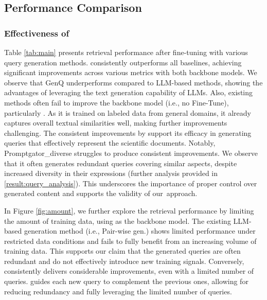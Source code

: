 


\subsection{Performance Comparison}
\label{sec:experimentresult}

\subsubsection{\textbf{Effectiveness of \proposed}}
\label{result:CCQGen}
Table \ref{tab:main} presents retrieval performance after fine-tuning with various query generation methods.
\proposed consistently outperforms all baselines, achieving significant improvements across various metrics with both backbone models.
We observe that GenQ underperforms compared to LLM-based methods, showing the advantages of leveraging the text generation capability of LLMs.
Also, existing methods often fail to improve the backbone model (i.e., no Fine-Tune), particularly \ctr.
As it is trained on labeled data from general domains, it already captures overall textual similarities well, making further improvements challenging.
The consistent improvements by \proposed support its efficacy in generating queries that effectively represent the scientific documents.
Notably, Promptgator\_diverse struggles to produce consistent improvements.
We observe that it often generates redundant queries covering similar aspects, despite increased diversity in their expressions (further analysis provided in \cref{result:query_analysis}).
This underscores the importance of proper control over generated content and supports the validity of our~approach.


In Figure \ref{fig:amount}, we further explore the retrieval performance by limiting the amount of training data, using \ctr as the backbone model.
The existing LLM-based generation method (i.e., Pair-wise gen.) shows limited performance under restricted data conditions and fails to fully benefit from an increasing volume of training data.
This supports our claim that the generated queries are often redundant and do not effectively introduce new training signals.
Conversely, \proposed consistently delivers considerable improvements, even with a limited number of queries.
\proposed guides each new query to complement the previous ones, allowing for reducing redundancy and fully leveraging the limited number of queries.



